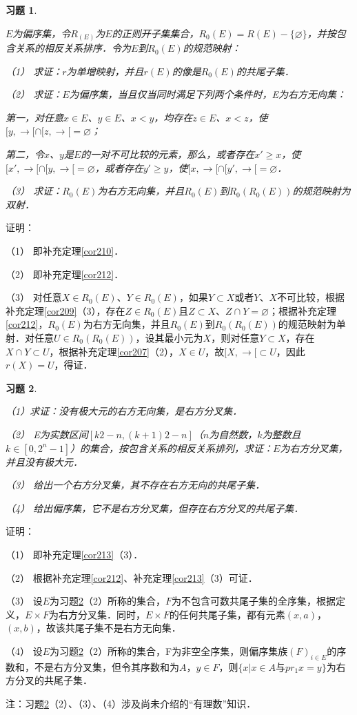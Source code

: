 \documentclass[12pt, a4paper, oneside]{book}
\newtheorem{exer}{习题}
\begin{document}
			\begin{exer}\label{exer99}
				\hfill\par
				$E$为偏序集，令$R_(E)$为$E$的正则开子集集合，$R_0(E)=R(E)-\{\varnothing\}$，并按包含关系的相反关系排序．令为$E$到$R_0(E)$的规范映射：
				\par
				（1）	求证：$r$为单增映射，并且$r(E)$的像是$R_0(E)$的共尾子集．
				\par
				（2）	求证：$E$为偏序集，当且仅当同时满足下列两个条件时，E为右方无向集：
				\par
				第一，对任意$x\in E$、$y\in E$、$x<y$，均存在$z\in E$、$x<z$，使$[y, \to [\cap[z, \to [=\varnothing$；
				\par
				第二，令$x$、$y$是$E$的一对不可比较的元素，那么，或者存在$x'\geq x$，使$[x', \to [\cap [y, \to [=\varnothing$，或者存在$y'\geq y$，使$[x, \to [\cap [y', \to [=\varnothing$．
				\par
				（3）	求证：$R_0(E)$为右方无向集，并且$R_0(E)$到$R_0(R_0(E))$的规范映射为双射．
			\end{exer}
			证明：
			\par
			（1）	即补充定理\ref{cor210}．
			\par
			（2）	即补充定理\ref{cor212}．
			\par
			（3）	对任意$X\in R_0(E)$、$Y\in R_0(E)$，如果$Y\subset X$或者$Y$、$X$不可比较，根据补充定理\ref{cor209}（3），存在$Z\in R_0(E)$且$Z\subset X$、$Z\cap Y=\varnothing$；根据补充定理\ref{cor212}，$R_0(E)$为右方无向集，并且$R_0(E)$到$R_0(R_0(E))$的规范映射为单射．对任意$U\in R_0(R_0(E))$，设其最小元为$X$，则对任意$Y\subset X$，存在$X\cap Y\subset U$，根据补充定理\ref{cor207}（2），$X\in U$，故$[X, \to [\subset U$，因此$r(X)=U$，得证．
			
			\begin{exer}\label{exer100}
				\hfill\par
				（1）求证：没有极大元的右方无向集，是右方分叉集．
				\par
				（2）	E为实数区间$[k2-n, (k+1)2-n]$（$n$为自然数，$k$为整数且$k\in [0, 2^n-1]$）的集合，按包含关系的相反关系排列，求证：$E$为右方分叉集，并且没有极大元．
				\par
				（3）	给出一个右方分叉集，其不存在右方无向的共尾子集．
				\par
				（4）	给出偏序集，它不是右方分叉集，但存在右方分叉的共尾子集．
			\end{exer}
			证明：
			\par
			（1）	即补充定理\ref{cor213}（3）．
			\par
			（2）	根据补充定理\ref{cor212}、补充定理\ref{cor213}（3）可证．
			\par
			（3）	设$E$为习题\ref{exer100}（2）所称的集合，$F$为不包含可数共尾子集的全序集，根据定义，$E\times F$为右方分叉集．同时，$E\times F$的任何共尾子集，都有元素$(x, a)$，$(x, b)$，故该共尾子集不是右方无向集．
			\par
			（4）	设$E$为习题\ref{exer100}（2）所称的集合，F为非空全序集，则偏序集族$(F)_{i\in E}$的序数和，不是右方分叉集，但令其序数和为$A$，$y\in F$，则$\{x|x\in A\text{与}pr_1x=y\}$为右方分叉的共尾子集．
			\par
			注：习题\ref{exer100}（2）、（3）、（4）涉及尚未介绍的“有理数”知识．
\end{document}

